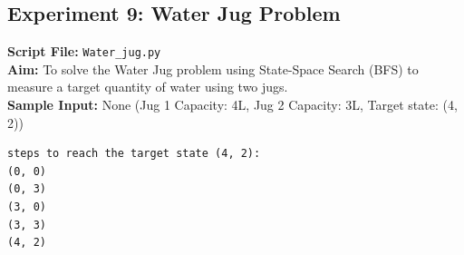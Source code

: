 \subsection*{Experiment 9: Water Jug Problem}
\textbf{Script File:} \texttt{Water_jug.py} \\[4pt]
\textbf{Aim:} To solve the Water Jug problem using State-Space Search (BFS) to measure a target quantity of water using two jugs. \\[4pt]
\textbf{Sample Input:} None (Jug 1 Capacity: 4L, Jug 2 Capacity: 3L, Target state: (4, 2)) \\[6pt]
\begin{tcolorbox}[colback=black!5!white,colframe=black!75!white,title=Terminal Execution Output - Water Jug Problem]
\begin{verbatim}
steps to reach the target state (4, 2):
(0, 0)
(0, 3)
(3, 0)
(3, 3)
(4, 2)
\end{verbatim}
\end{tcolorbox}

